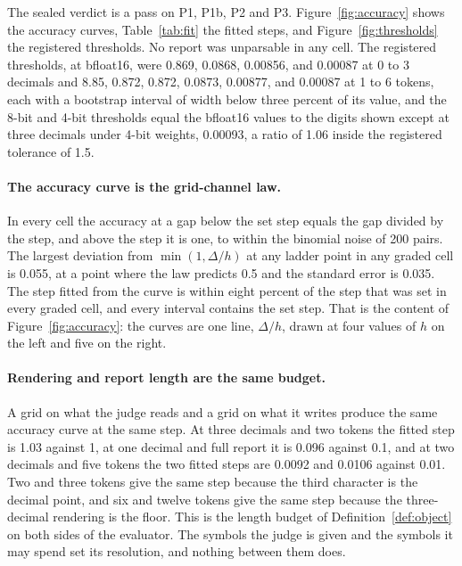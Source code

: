 \documentclass{article}
\theoremstyle{definition}
\theoremstyle{remark}
\begin{document}
The sealed verdict is a pass on P1, P1b, P2 and P3.
Figure~\ref{fig:accuracy} shows the accuracy curves, Table~\ref{tab:fit} the fitted steps, and Figure~\ref{fig:thresholds} the registered thresholds.
No report was unparsable in any cell.
The registered thresholds, at bfloat16, were 0.869, 0.0868, 0.00856, and 0.00087 at 0 to 3 decimals and 8.85, 0.872, 0.872, 0.0873, 0.00877, and 0.00087 at 1 to 6 tokens, each with a bootstrap interval of width below three percent of its value, and the 8-bit and 4-bit thresholds equal the bfloat16 values to the digits shown except at three decimals under 4-bit weights, 0.00093, a ratio of 1.06 inside the registered tolerance of 1.5.

\paragraph{The accuracy curve is the grid-channel law.}
In every cell the accuracy at a gap below the set step equals the gap divided by the step, and above the step it is one, to within the binomial noise of 200 pairs.
The largest deviation from $\min(1,\Delta/h)$ at any ladder point in any graded cell is 0.055, at a point where the law predicts 0.5 and the standard error is 0.035.
The step fitted from the curve is within eight percent of the step that was set in every graded cell, and every interval contains the set step.
That is the content of Figure~\ref{fig:accuracy}: the curves are one line, $\Delta/h$, drawn at four values of $h$ on the left and five on the right.

\paragraph{Rendering and report length are the same budget.}
A grid on what the judge reads and a grid on what it writes produce the same accuracy curve at the same step.
At three decimals and two tokens the fitted step is 1.03 against 1, at one decimal and full report it is 0.096 against 0.1, and at two decimals and five tokens the two fitted steps are 0.0092 and 0.0106 against 0.01.
Two and three tokens give the same step because the third character is the decimal point, and six and twelve tokens give the same step because the three-decimal rendering is the floor.
This is the length budget of Definition~\ref{def:object} on both sides of the evaluator. The symbols the judge is given and the symbols it may spend set its resolution, and nothing between them does.
\end{document}
